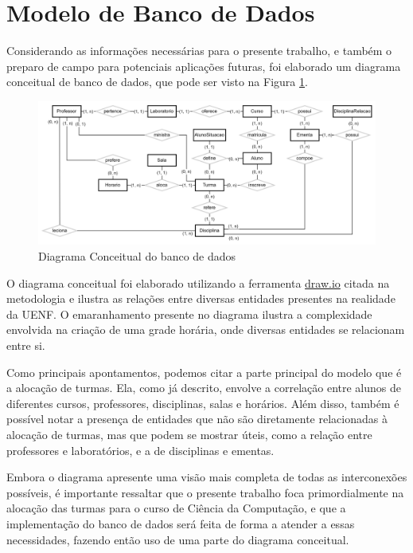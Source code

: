 \section{Modelo de Banco de Dados} %

Considerando as informações necessárias para o presente trabalho, e também o preparo de campo para potenciais aplicações futuras, foi elaborado um diagrama conceitual de banco de dados, que pode ser visto na Figura \ref{fig:DiagramConceitual}.

\begin{figure}[htbp]\centering
  \caption{\label{fig:DiagramConceitual} Diagrama Conceitual do banco de dados}
  \includegraphics[scale=0.2]{files/img/DiagramaConceitual/DiagramaConceitualBranco.png}
\end{figure} %

O diagrama conceitual foi elaborado utilizando a ferramenta \href{https://www.drawio.com/}{draw.io} citada na metodologia e ilustra as relações entre diversas entidades presentes na realidade da UENF. O emaranhamento presente no diagrama ilustra a complexidade envolvida na criação de uma grade horária, onde diversas entidades se relacionam entre si.

Como principais apontamentos, podemos citar a parte principal do modelo que é a alocação de turmas. Ela, como já descrito, envolve a correlação entre alunos de diferentes cursos, professores, disciplinas, salas e horários. Além disso, também é possível notar a presença de entidades que não são diretamente relacionadas à alocação de turmas, mas que podem se mostrar úteis, como a relação entre professores e laboratórios, e a de disciplinas e ementas.

Embora o diagrama apresente uma visão mais completa de todas as interconexões possíveis, é importante ressaltar que o presente trabalho foca primordialmente na alocação das turmas para o curso de Ciência da Computação, e que a implementação do banco de dados será feita de forma a atender a essas necessidades, fazendo então uso de uma parte do diagrama conceitual.

